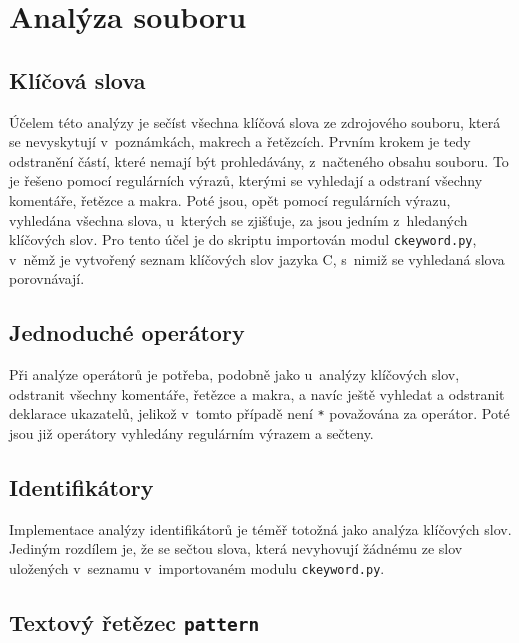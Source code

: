 \documentclass[10pt,a4paper,final]{article}
\begin{document}
  \section{Analýza souboru} \label{analyza}

    \subsection{Klíčová slova} \label{klicova-slova}

      Účelem této analýzy je sečíst všechna klíčová slova ze zdrojového
      souboru, která se nevyskytují v~poznámkách, makrech a řetězcích.
      Prvním krokem je tedy odstranění částí, které nemají být prohledávány,
      z~načteného obsahu souboru. To je řešeno pomocí regulárních výrazů,
      kterými se vyhledají a odstraní všechny komentáře, řetězce a makra. Poté
      jsou, opět pomocí regulárních výrazu, vyhledána všechna slova, u~kterých
      se zjišťuje, za jsou jedním z~hledaných klíčových slov. Pro tento
      účel je do skriptu importován modul \texttt{ckeyword.py}, v~němž je
      vytvořený seznam klíčových slov jazyka C, s~nimiž se vyhledaná slova 
      porovnávají.

    \subsection{Jednoduché operátory} \label{operatory}

      Při analýze operátorů je potřeba, podobně jako u~analýzy klíčových slov,
      odstranit všechny komentáře, řetězce a makra, a navíc ještě vyhledat a
      odstranit deklarace ukazatelů, jelikož v~tomto případě není \texttt{*}
      považována za operátor. Poté jsou již operátory vyhledány regulárním
      výrazem a sečteny.

    \subsection{Identifikátory} \label{identifikatory}

      Implementace analýzy identifikátorů je téměř totožná jako analýza
      klíčových slov. Jediným rozdílem je, že se sečtou slova, která nevyhovují
      žádnému ze slov uložených v~seznamu v~importovaném modulu
      \texttt{ckeyword.py}.

    \subsection{Textový řetězec \texttt{pattern}} \label{retezec}
\end{document}
